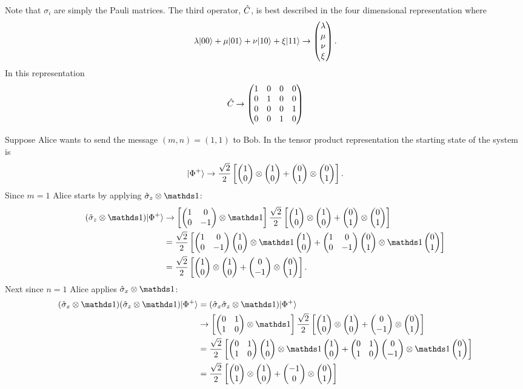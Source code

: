     Note that \(\sigma_i\) are simply the Pauli matrices.
    The third operator, \(\hat{C}\), is best described in the four dimensional representation where
    \[
        \lambda\vert {00} \rangle + \mu\vert {01} \rangle + \nu\vert {10} \rangle + \xi\vert {11} \rangle \mathrel{\rightarrow}
        \begin{pmatrix}
            \lambda\\ \mu\\ \nu\\ \xi
        \end{pmatrix}
        .
    \]
    In this representation
    \[\hat{C} \mathrel{\rightarrow} \begin{pmatrix} 1 & 0 & 0 & 0\\ 0 & 1 & 0 & 0\\ 0 & 0 & 0 & 1\\ 0 & 0 & 1 & 0 \end{pmatrix}\]
    
    Suppose Alice wants to send the message \((m, n) = (1, 1)\) to Bob.
    In the tensor product representation the starting state of the system is
    \[
        \vert {\Phi^+} \rangle \mathrel{\rightarrow} \frac{\sqrt{2}}{2} \left[\begin{pmatrix} {1} \\ {0} \end{pmatrix} \otimes \begin{pmatrix} {1} \\ {0} \end{pmatrix} + \begin{pmatrix} {0} \\ {1} \end{pmatrix} \otimes \begin{pmatrix} {0} \\ {1} \end{pmatrix}\right].
    \]
    Since \(m = 1\) Alice starts by applying \(\operator{\sigma}_z \tensorProd \ident\):
    \begin{align*}
        (\operator{\sigma}_z \tensorProd \ident)\ket{\Phi^+} &\representation \left[\twoMat{1}{0}{0}{-1}\tensorProd \ident\right]\frac{\sqrt{2}}{2} \left[\twoVec{1}{0} \tensorProd \twoVec{1}{0} + \twoVec{0}{1} \tensorProd \twoVec{0}{1}\right]\\
        &= \frac{\sqrt{2}}{2}\left[\twoMat{1}{0}{0}{-1}\twoVec{1}{0} \tensorProd \ident \twoVec{1}{0} + \twoMat{1}{0}{0}{-1}\twoVec{0}{1} \tensorProd \ident \twoVec{0}{1}\right]\\
        &= \frac{\sqrt{2}}{2}\left[\twoVec{1}{0} \tensorProd \twoVec{1}{0} + \twoVec{0}{-1} \tensorProd \twoVec{0}{1}\right].
    \end{align*}
    Next since \(n = 1\) Alice applies \(\operator{\sigma}_x\tensorProd\ident\):
    \begin{align*}
        (\operator{\sigma}_x\tensorProd\ident)(\operator{\sigma}_z \tensorProd \ident)\ket{\Phi^+} &= (\operator{\sigma}_x\operator{\sigma}_z\tensorProd\ident)\ket{\Phi^+}\\
        &\representation \left[\twoMat{0}{1}{1}{0}\tensorProd\ident\right] \frac{\sqrt{2}}{2} \left[\twoVec{1}{0} \tensorProd \twoVec{1}{0} + \twoVec{0}{-1} \tensorProd \twoVec{0}{1}\right]\\
        &= \frac{\sqrt{2}}{2} \left[\twoMat{0}{1}{1}{0} \twoVec{1}{0} \tensorProd \ident \twoVec{1}{0} + \twoMat{0}{1}{1}{0} \twoVec{0}{-1} \tensorProd \ident \twoVec{0}{1}\right]\\
        &= \frac{\sqrt{2}}{2} \left[\twoVec{0}{1} \tensorProd \twoVec{1}{0} + \twoVec{-1}{0} \tensorProd \twoVec{0}{1}\right]\\
    \end{align*}
